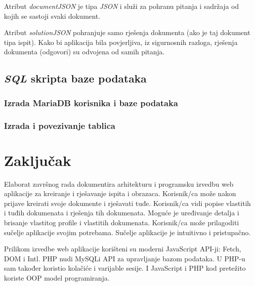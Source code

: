       Atribut \textit{documentJSON} je tipa \textit{JSON} i služi za pohranu
      pitanja i sadržaja od kojih se sastoji svaki dokument.

      Atribut \textit{solutionJSON} pohranjuje samo rješenja dokumenta (ako je
      taj dokument tipa ispit). Kako bi aplikacija bila povjerljiva, iz
      sigurnosnih razloga, rješenja dokumenta (odgovori) su odvojena od samih
      pitanja.

    \subsection{\textit{SQL} skripta baze podataka}

      \subsubsection{Izrada MariaDB korisnika i baze podataka}

        

      \pagebreak[4]
      \subsubsection{Izrada i povezivanje tablica}

        




\section{Zaključak}

  Elaborat završnog rada dokumentira arhitekturu i programsku izvedbu web
  aplikacije za kreiranje i rješavanje ispita i obrazaca. Korisnik/ca može nakon
  prijave kreirati svoje dokumente i rješavati tuđe. Korisnik/ca vidi popise
  vlastitih i tuđih dokumenata i rješenja tih dokumenata. Moguće je uređivanje
  detalja i brisanje vlastitog profile i vlastitih dokumenata. Korisnik/ca može
  prilagoditi sučelje aplikacije svojim potrebama. Sučelje aplikacije je
  intuitivno i pristupačno.

  Prilikom izvedbe web aplikacije korišteni su moderni JavaScript API-ji: Fetch,
  DOM i Intl. PHP nudi MySQLi API za upravljanje bazom podataka. U PHP-u sam
  također koristio kolačiće i varijable sesije. I JavaScript i PHP kod pretežito
  koriste OOP model programiranja.

